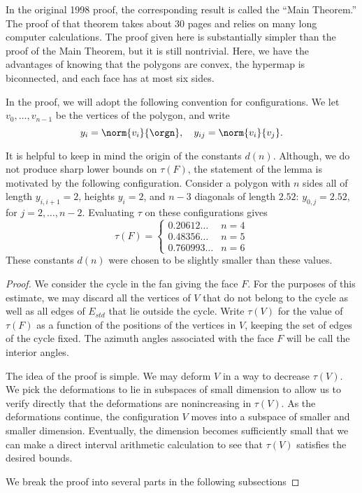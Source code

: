 In the original 1998 proof, the corresponding result
is called the ``Main Theorem.''  The proof of that 
theorem takes about 30 pages and relies on many
long computer calculations.  The proof given here
is substantially simpler than the proof of the
Main Theorem, but
it is still nontrivial.  Here, we have the advantages
of knowing that the polygons are convex, the hypermap
is biconnected, and each face has at most six sides.

In the proof, we will adopt the following convention for
configurations.  We let $v_0,\ldots,v_{n-1}$ be the vertices
of the polygon, and write
$$
y_i = \norm{v_i}{\orgn},\quad y_{ij} = \norm{v_i}{ v_j}.
$$

It is helpful to keep in mind the origin of the constants $d(n)$.
Although, we do not produce sharp lower bounds on $\tau(F)$, the
statement of the lemma is motivated by the following configuration.
Consider a polygon with $n$ sides all of length $y_{i,i+1}=2$, heights
$y_i=2$, and $n-3$ diagonals of length $2.52$: $y_{0,j}=2.52$, for
$j=2,\ldots,n-2$.  Evaluating $\tau$ on these configurations gives
$$
\tau(F) = \begin{cases}
0.20612\ldots & n=4\\
0.48356\ldots & n=5\\
0.760993\ldots &n=6
\end{cases}
$$
These constants $d(n)$ were chosen to be slightly smaller than these values.


\begin{proof}  We consider the cycle in the fan
giving the face $F$.  For the purposes of this
estimate, we may discard all the vertices of $V$
that do not belong to the cycle as well as all edges
of $E_{std}$ that lie outside the cycle.
Write $\tau(V)$ for the value of $\tau(F)$ as a
function of the positions of the vertices in $V$,
keeping the set of edges of the cycle fixed.  The
azimuth angles associated with the face $F$ will be
call the interior angles.  

The idea of the proof is simple.  We may deform $V$ in a way to decrease $\tau(V)$.  We pick the deformations to lie in subspaces of small dimension to allow us to verify directly that the deformations are nonincreasing in $\tau(V)$.  As the deformations continue, the configuration $V$ moves into a subspace of smaller and smaller dimension.  Eventually, the dimension becomes sufficiently small that we can make a direct interval arithmetic calculation to see that $\tau(V)$ satisfies the desired bounds.

We break the proof into several parts in the following
subsections
\end{proof}


